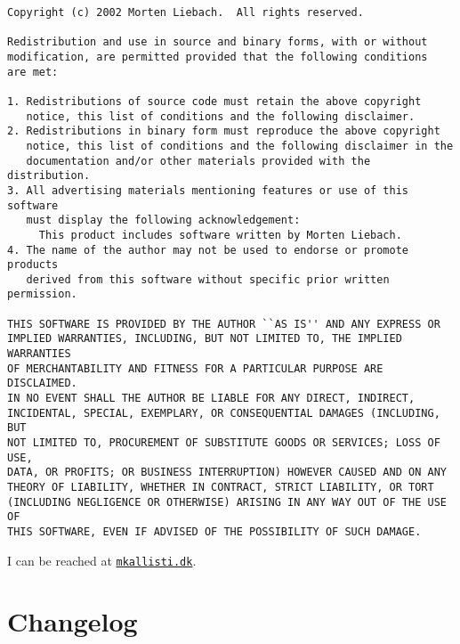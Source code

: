 \documentclass[a4paper,11pt,oneside]{scrartcl}
\begin{document}
\small{
\begin{verbatim}
Copyright (c) 2002 Morten Liebach.  All rights reserved.
 
Redistribution and use in source and binary forms, with or without
modification, are permitted provided that the following conditions
are met:

1. Redistributions of source code must retain the above copyright
   notice, this list of conditions and the following disclaimer.
2. Redistributions in binary form must reproduce the above copyright
   notice, this list of conditions and the following disclaimer in the
   documentation and/or other materials provided with the distribution.
3. All advertising materials mentioning features or use of this software
   must display the following acknowledgement:
     This product includes software written by Morten Liebach.
4. The name of the author may not be used to endorse or promote products
   derived from this software without specific prior written permission.
 
THIS SOFTWARE IS PROVIDED BY THE AUTHOR ``AS IS'' AND ANY EXPRESS OR
IMPLIED WARRANTIES, INCLUDING, BUT NOT LIMITED TO, THE IMPLIED WARRANTIES
OF MERCHANTABILITY AND FITNESS FOR A PARTICULAR PURPOSE ARE DISCLAIMED.
IN NO EVENT SHALL THE AUTHOR BE LIABLE FOR ANY DIRECT, INDIRECT,
INCIDENTAL, SPECIAL, EXEMPLARY, OR CONSEQUENTIAL DAMAGES (INCLUDING, BUT
NOT LIMITED TO, PROCUREMENT OF SUBSTITUTE GOODS OR SERVICES; LOSS OF USE,
DATA, OR PROFITS; OR BUSINESS INTERRUPTION) HOWEVER CAUSED AND ON ANY
THEORY OF LIABILITY, WHETHER IN CONTRACT, STRICT LIABILITY, OR TORT
(INCLUDING NEGLIGENCE OR OTHERWISE) ARISING IN ANY WAY OUT OF THE USE OF
THIS SOFTWARE, EVEN IF ADVISED OF THE POSSIBILITY OF SUCH DAMAGE.
\end{verbatim}
}

I can be reached at
\texttt{\href{mailto:m\at kallisti.dk}{m\at kallisti.dk}}.



\newpage
\section{Changelog} %
\label{sec:changelog}
\end{document}

